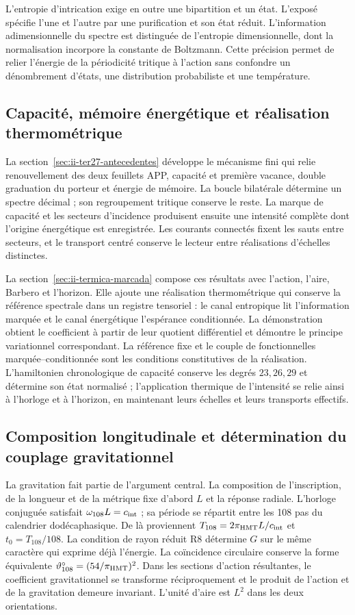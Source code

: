 L'entropie d'intrication exige en outre une bipartition et un
état. L'exposé spécifie l'une et l'autre par une purification et son
état réduit. L'information adimensionnelle du spectre est distinguée
de l'entropie dimensionnelle, dont la normalisation incorpore la constante
de Boltzmann. Cette précision permet de relier l'énergie de la
périodicité tritique à l'action sans confondre un dénombrement d'états,
une distribution probabiliste et une température.

\subsection{Capacité, mémoire énergétique et réalisation thermométrique}

La section~\ref{sec:ii-ter27-antecedentes} développe le mécanisme fini
qui relie renouvellement des deux feuillets APP, capacité et première vacance,
double graduation du porteur et énergie de mémoire. La boucle bilatérale
détermine un spectre décimal ; son regroupement tritique conserve le reste.
La marque de capacité et les secteurs d'incidence produisent ensuite
une intensité complète dont l'origine énergétique est enregistrée. Les courants
connectés fixent les sauts entre secteurs, et le transport centré
conserve le lecteur entre réalisations d'échelles distinctes.

La section~\ref{sec:ii-termica-marcada} compose ces résultats avec l'action, l'aire, Barbero et l'horizon. Elle ajoute une réalisation thermométrique qui conserve la référence spectrale dans un registre tensoriel : le canal entropique lit l'information marquée et le canal énergétique l'espérance conditionnée. La démonstration obtient le coefficient à partir de leur quotient différentiel et démontre le principe variationnel correspondant. La référence fixe et le couple de fonctionnelles marquée--conditionnée sont les conditions constitutives de la réalisation. L'hamiltonien chronologique de capacité conserve les degrés $23,26,29$ et détermine son état normalisé ; l'application thermique de l'intensité se relie ainsi à l'horloge et à l'horizon, en maintenant leurs échelles et leurs transports effectifs.

\subsection{Composition longitudinale et détermination du couplage gravitationnel}

La gravitation fait partie de l'argument central. La composition de l'inscription, de la longueur et de la métrique fixe d'abord \(L\) et la réponse radiale. L'horloge conjuguée satisfait \(\omega_{108}L=c_{\rm int}\) ; sa période se répartit entre les 108 pas du calendrier dodécaphasique. De là proviennent \(T_{108}=2\pi_{\mathrm{HMT}}L/c_{\rm int}\) et \(t_0=T_{108}/108\). La condition de rayon réduit R8 détermine \(G\) sur le même caractère qui exprime déjà l'énergie. La coïncidence circulaire conserve la forme équivalente \(\vartheta_{108}^{\circ}=(54/\pi_{\mathrm{HMT}})^2\). Dans les sections d'action résultantes, le coefficient gravitationnel se transforme réciproquement et le produit de l'action et de la gravitation demeure invariant. L'unité d'aire est \(L^2\) dans les deux orientations.

